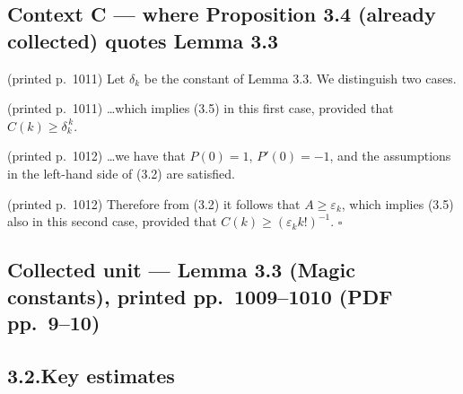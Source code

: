 \documentclass[11pt]{article}
\begin{document}
\subsection*{Context C --- where Proposition 3.4 (already collected) quotes Lemma 3.3}


\noindent (printed p.~1011) Let $\delta_k$ be the constant of Lemma 3.3. We distinguish two cases.

\noindent (printed p.~1011) \dots which implies (3.5) in this first case, provided that
$C(k) \ge \delta_k^{\,k}$.

\noindent (printed p.~1012) \dots we have that $P(0)=1$, $P'(0)=-1$, and the assumptions in the
left-hand side of (3.2) are satisfied.

\noindent (printed p.~1012) Therefore from (3.2) it follows that $A \ge \varepsilon_k$, which
implies (3.5) also in this second case, provided that $C(k) \ge (\varepsilon_k k!)^{-1}$.
\hfill$\square$

\subsection*{Collected unit --- Lemma 3.3 (Magic constants), printed pp.~1009--1010 (PDF pp.~9--10)}


\subsection*{3.2.\quad Key estimates}
\end{document}
